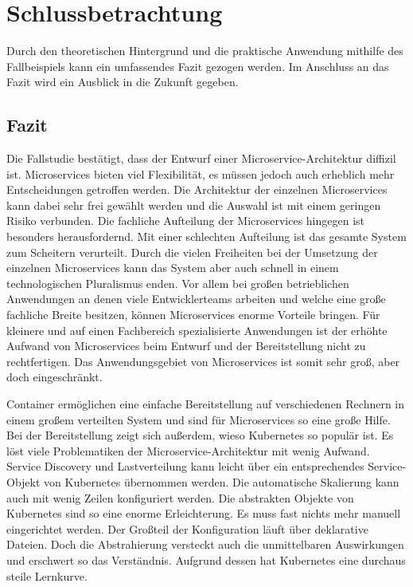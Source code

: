 \section{Schlussbetrachtung}

Durch den theoretischen Hintergrund und die praktische Anwendung mithilfe des Fallbeispiels kann ein umfassendes Fazit gezogen werden. Im Anschluss an das Fazit wird ein Ausblick in die Zukunft gegeben.

\subsection{Fazit}
Die Fallstudie bestätigt, dass der Entwurf einer Microservice-Architektur diffizil ist. Microservices bieten viel Flexibilität, es müssen jedoch auch erheblich mehr Entscheidungen getroffen werden. Die Architektur der einzelnen Microservices kann dabei sehr frei gewählt werden und die Auswahl ist mit einem geringen Risiko verbunden. Die fachliche Aufteilung der Microservices hingegen ist besonders herausfordernd. Mit einer schlechten Aufteilung ist das gesamte System zum Scheitern verurteilt. Durch die vielen Freiheiten bei der Umsetzung der einzelnen Microservices kann das System aber auch schnell in einem technologischen Pluralismus enden. Vor allem bei großen betrieblichen Anwendungen an denen viele Entwicklerteams arbeiten und welche eine große fachliche Breite besitzen, können Microservices enorme Vorteile bringen. Für kleinere und auf einen Fachbereich spezialisierte Anwendungen ist der erhöhte Aufwand von Microservices beim Entwurf und der Bereitstellung nicht zu rechtfertigen. Das Anwendungsgebiet von Microservices ist somit sehr groß, aber doch eingeschränkt.

Container ermöglichen eine einfache Bereitstellung auf verschiedenen Rechnern in einem großem verteilten System und sind für Microservices so eine große Hilfe. Bei der Bereitstellung zeigt sich außerdem, wieso Kubernetes so populär ist. Es löst viele Problematiken der Microservice-Architektur mit wenig Aufwand. Service Discovery und Lastverteilung kann leicht über ein entsprechendes Service-Objekt von Kubernetes übernommen werden. Die automatische Skalierung kann auch mit wenig Zeilen konfiguriert werden. Die abstrakten Objekte von Kubernetes sind so eine enorme Erleichterung. Es muss fast nichts mehr manuell eingerichtet werden. Der Großteil der Konfiguration läuft über deklarative Dateien. Doch die Abstrahierung versteckt auch die unmittelbaren Auswirkungen und erschwert so das Verständnis. Aufgrund dessen hat Kubernetes eine durchaus steile Lernkurve.

